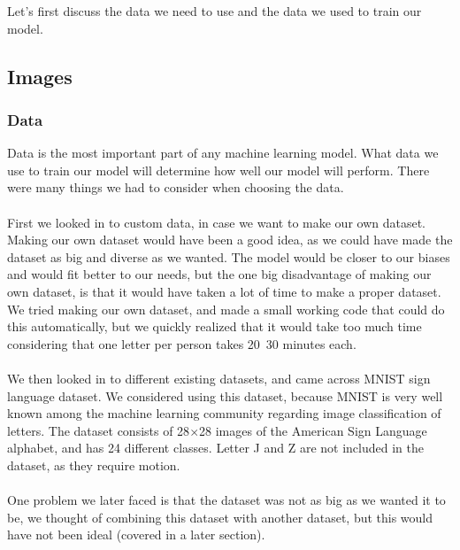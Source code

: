 \documentclass[../paper.tex]{subfiles}
\begin{document}
    Let's first discuss the data we need to use and the data we used to train our model.
    
    \subsection{Images}
    \subsubsection{Data}
    Data is the most important part of any machine learning model.
    What data we use to train our model will determine how well our model will perform. 
    There were many things we had to consider when choosing the data.\\
    \\
    First we looked in to custom data, in case we want to make our own dataset. 
    Making our own dataset would have been a good idea, 
    as we could have made the dataset as big and diverse as we wanted.
    The model would be closer to our biases and would fit better to our needs, 
    but the one big disadvantage of making our own dataset, is that it would have taken a lot of time to make a proper dataset.\\
    We tried making our own dataset, and made a small working code that could do this automatically, 
    but we quickly realized that it would take too much time considering that one letter per person takes 20~30 minutes each.\\
    \\
    We then looked in to different existing datasets, and came across MNIST sign language dataset\cite{d0}. 
    We considered using this dataset, because MNIST is very well known among the machine learning community regarding image classification of letters\cite{o0}.
    The dataset consists of 28$\times$28 images of the American Sign Language alphabet, 
    and has 24 different classes. 
    Letter J and Z are not included in the dataset, as they require motion.\\
    \\
    One problem we later faced is that the dataset was not as big as we wanted it to be,
    we thought of combining this dataset with another dataset, but this would have not been ideal (covered in a later section).
\end{document}
